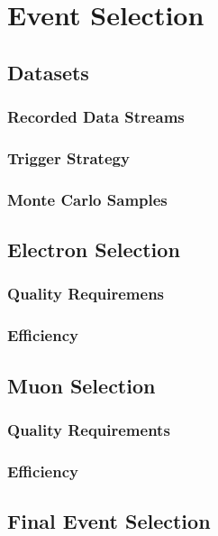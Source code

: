 \chapter{Event Selection}


\section{Datasets}
\subsection{Recorded Data Streams}
\subsection{Trigger Strategy}
\subsection{Monte Carlo Samples}

\section{Electron Selection}
\subsection{\label{sec:elec_qual_req}Quality Requiremens}
\subsection{Efficiency}

\section{Muon Selection}
\subsection{\label{sec:mu_qual_req} Quality Requirements}
\subsection{Efficiency}

\section{Final Event Selection}

